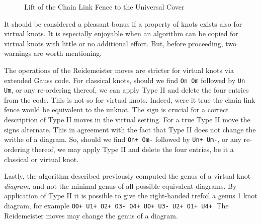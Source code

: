 \documentclass{article}
\theoremstyle{plain}
\begin{document}
        \begin{figure}
            \centering
            \caption{Lift of the Chain Link Fence to the Universal Cover}
            \label{fig:chain_link_fence_knot_on_flat_torus_universal_cover}
        \end{figure}
        \par\hfill\par
        It should be considered a pleasant bonus if a property of knots exists
        also for virtual knots. It is especially enjoyable when an
        algorithm can be copied for virtual knots with little or no additional
        effort. But, before proceeding, two warnings are worth mentioning.
        \par\hfill\par
        The operations of the Reidemeister moves are stricter for virtual knots
        via extended Gauss code. For classical knots, should we find
        \texttt{On Om} followed by \texttt{Un Um}, or any re-ordering thereof,
        we can apply Type II and delete the four entries from the code. This is
        not so for virtual knots. Indeed, were it true the chain link fence
        would be equivalent to the unknot. The sign is crucial for a correct
        description of Type II moves in the virtual setting. For a true
        Type II move the signs alternate. This in agreement with the fact that
        Type II does not change the writhe of a diagram. So, should we find
        \texttt{On+ Om-} followed by \texttt{Un+ Um-}, or any re-ordering
        thereof, we may apply Type II and delete the four entries, be it a
        classical or virtual knot.
        \par\hfill\par
        Lastly, the algorithm described previously computed the genus of a
        virtual knot \textit{diagram}, and not the minimal genus of all
        possible equivalent diagrams. By application of Type II it is possible
        to give the right-handed trefoil a genus 1 knot diagram, for example
        \texttt{O0+ U1+ O2+ O3- O4+ U0+ U3- U2+ O1+ U4+}. The Reidemeister
        moves may change the genus of a diagram.
\end{document}
